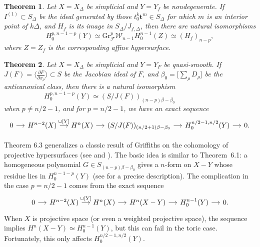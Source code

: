 \documentclass{amsart}
\theoremstyle{plain}
\newtheorem{theorem}{Theorem}[section]
\theoremstyle{definition}
\begin{document}
\begin{theorem} Let $X = X_\Delta$ be simplicial and $Y = Y_f$ be
nondegenerate.  If $I^{(1)} \subset S_\Delta$ be the ideal generated by those
$t_0^k\mathbf{t}^m \in S_\Delta$ for which $m$ is an interior point of
$k\Delta$, and $H_f$ is its image in $S_\Delta/J_{f,\Delta}$, then
there are natural isomorphisms
\[
H^{p,n-1-p}_0(Y) \simeq \mathrm{Gr}_{\mathcal{F}}^p
\mathcal{W}_{n-1}H^{n-1}_0(Z) \simeq (H_f)_{n-p},
\]
where $Z = Z_f$ is the corresponding affine hypersurface.
\end{theorem}

\begin{theorem} Let $X = X_\Delta$ be simplicial and $Y = Y_F$ be
quasi-smooth.  If $J(F) = \langle \frac{\partial F}{\partial
x_\rho}\rangle \subset S$ be the Jacobian ideal of $F$, and $\beta_0
=\big [\sum_\rho D_\rho\big]$ be the anticanonical class, then there
is a natural isomorphism
\[
\,H^{p,n-1-p}_0(Y) \simeq (S/J(F))_{(n-p)\beta-\beta_0}
\phantom{\qquad\qquad\qquad}
\]
when $p \ne n/2-1$, and for $p = n/2-1$, we have an exact sequence
\[
\begin{tikzcd}[column sep=small]
0 \arrow[r] & H^{n-2}(X) \arrow[r, "{\cup[Y]}"] & H^{n}(X) \arrow[r] & (S/J(F))_{(n/2+1)\beta-\beta_0} \arrow[r] & H^{n/2-1,n/2}_0(Y) \arrow[r] & 0.
\end{tikzcd}
\]
\end{theorem}

	Theorem 6.3 generalizes a classic result of Griffiths on the
cohomology of projective hypersurfaces (see \cite{Gri} and \cite{PS}).
The basic idea is similar to Theorem~6.1: a homogeneous polynomial $G
\in S_{(n-p)\beta-\beta_0}$ gives a $n$-form on $X-Y$ whose residue
lies in $H_0^{n-1-p}(Y)$ (see \cite{BC} for a precise description).
The complication in the case $p=n/2-1$ comes from the exact sequence
\[
\begin{tikzcd}[column sep=small]
0 \arrow[r] & H^{n-2}(X) \arrow[r, "{\cup[Y]}"] & H^{n}(X) \arrow[r] & H^n(X-Y) \arrow[r] & H^{n-1}_0(Y) \arrow[r] & 0.
\end{tikzcd}
\]
When $X$ is projective space (or even a weighted projective space),
the sequence implies $H^n(X-Y) \simeq H^{n-1}_0(Y)$, but this can fail
in the toric case.  Fortunately, this only affects
$H^{n/2-1,n/2}_0(Y)$.  
\end{document}
